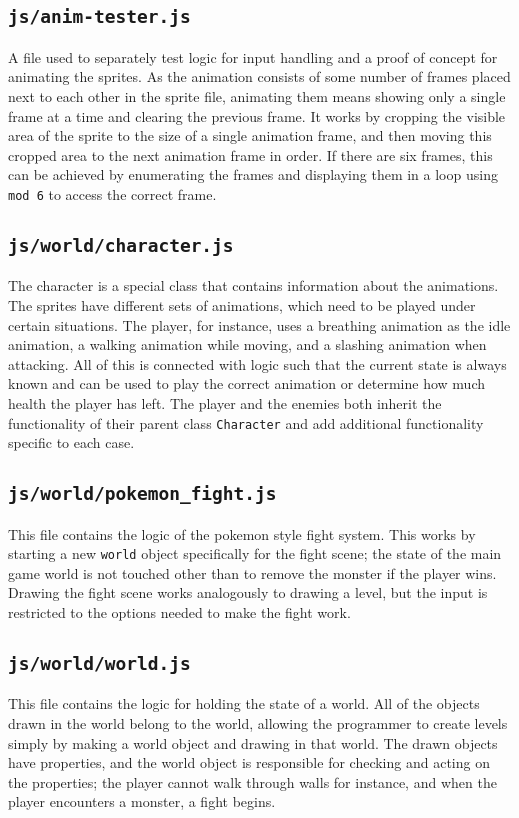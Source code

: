 \documentclass[11pt]{article}
\begin{document}
\subsection{\texttt{js/anim-tester.js}}
\label{sec:orge456551}
A file used to separately test logic for input handling and a proof of concept for animating the sprites. As the animation consists of some number of frames placed next to each other in the sprite file, animating them means showing only a single frame at a time and clearing the previous frame. It works by cropping the visible area of the sprite to the size of a single animation frame, and then moving this cropped area to the next animation frame in order. If there are six frames, this can be achieved by enumerating the frames and displaying them in a loop using \texttt{mod 6} to access the correct frame.\\
\subsection{\texttt{js/world/character.js}}
\label{sec:org0daffd0}
The character is a special class that contains information about the animations. The sprites have different sets of animations, which need to be played under certain situations. The player, for instance, uses a breathing animation as the idle animation, a walking animation while moving, and a slashing animation when attacking. All of this is connected with logic such that the current state is always known and can be used to play the correct animation or determine how much health the player has left. The player and the enemies both inherit the functionality of their parent class \texttt{Character} and add additional functionality specific to each case.\\
\subsection{\texttt{js/world/pokemon\_fight.js}}
\label{sec:org02f5229}
This file contains the logic of the pokemon style fight system. This works by starting a new \texttt{world} object specifically for the fight scene; the state of the main game world is not touched other than to remove the monster if the player wins. Drawing the fight scene works analogously to drawing a level, but the input is restricted to the options needed to make the fight work.\\
\subsection{\texttt{js/world/world.js}}
\label{sec:org3e5c52d}
This file contains the logic for holding the state of a world. All of the objects drawn in the world belong to the world, allowing the programmer to create levels simply by making a world object and drawing in that world. The drawn objects have properties, and the world object is responsible for checking and acting on the properties; the player cannot walk through walls for instance, and when the player encounters a monster, a fight begins.\\
\end{document}
